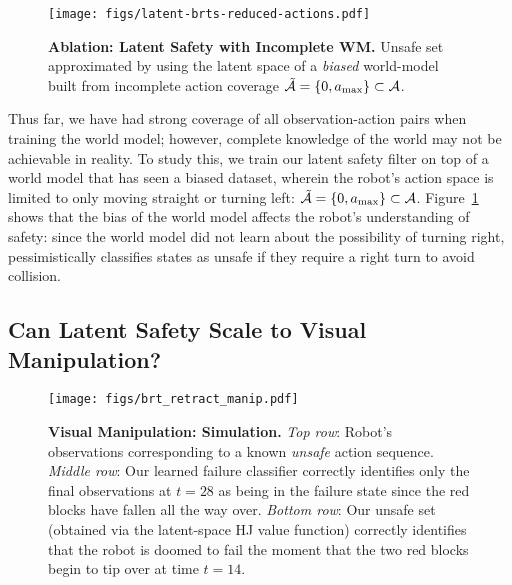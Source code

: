 \begin{figure}[h!t]
    \centering
    \texttt{[image: figs/latent-brts-reduced-actions.pdf]}
    \caption{\textbf{Ablation: Latent Safety with Incomplete WM.}
    Unsafe set approximated by \ours using the latent space of a \emph{biased} world-model built from incomplete action coverage $\tilde{\mathcal{A}}=\{0, a_\textrm{max}\}\subset \mathcal{A}$.
    }
    \label{fig:dubins-ablation}
\end{figure}

Thus far, we have had strong coverage of all observation-action pairs when training the world model; however, complete knowledge of the world may not be achievable in reality.
To study this, we train our latent safety filter on top of a world model that has seen a biased dataset, wherein the robot's action space is limited to only moving straight or turning left: $\tilde{\mathcal{A}} = \{0, a_\mathrm{max} \} \subset \mathcal{A}$.
Figure~\ref{fig:dubins-ablation} shows that the bias of the world model affects the robot's understanding of safety: since the world model did not learn about the possibility of turning right, \ours pessimistically classifies states as unsafe if they require a right turn to avoid collision. %




\subsection{Can Latent Safety Scale to Visual Manipulation?}

\begin{figure*}[t!]
    \centering
    \texttt{[image: figs/brt\_retract\_manip.pdf]} %
    \caption{
    \textbf{Visual Manipulation: Simulation.} \textit{Top row}: Robot's observations corresponding to a known \textit{unsafe} action sequence. \textit{Middle row}: Our learned failure classifier correctly identifies only the final observations at $t=28$ as being in the failure state since the red blocks have fallen all the way over. \textit{Bottom row}: Our unsafe set (obtained via the latent-space HJ value function) correctly identifies that the robot is doomed to fail the moment that the two red blocks begin to tip over at time $t=14$. %
    }
    \label{fig:sim-manip}
\end{figure*}

